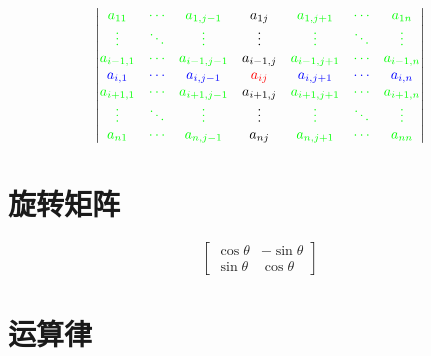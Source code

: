 \documentclass{article}
\begin{document}
\[\begin{vmatrix}
        \textcolor{green}{a_{11}}    & \textcolor{green}{\cdots} & \textcolor{green}{a_{1,j-1}}   & a_{1j}            & \textcolor{green}{a_{1,j+1}}   & \textcolor{green}{\cdots} & \textcolor{green}{a_{1n}}    \\
        \textcolor{green}{\vdots}    & \textcolor{green}{\ddots} & \textcolor{green}{\vdots}      & \vdots            & \textcolor{green}{\vdots}      & \textcolor{green}{\ddots} & \textcolor{green}{\vdots}    \\
        \textcolor{green}{a_{i-1,1}} & \textcolor{green}{\cdots} & \textcolor{green}{a_{i-1,j-1}} & a_{i-1,j}         & \textcolor{green}{a_{i-1,j+1}} & \textcolor{green}{\cdots} & \textcolor{green}{a_{i-1,n}} \\
        \textcolor{blue}{a_{i,1}}    & \textcolor{blue}{\cdots}  & \textcolor{blue}{a_{i,j-1}}    & \color{red}a_{ij} & \textcolor{blue}{a_{i,j+1}}    & \textcolor{blue}{\cdots}  & \textcolor{blue}{a_{i,n}}    \\
        \textcolor{green}{a_{i+1,1}} & \textcolor{green}{\cdots} & \textcolor{green}{a_{i+1,j-1}} & a_{i+1,j}         & \textcolor{green}{a_{i+1,j+1}} & \textcolor{green}{\cdots} & \textcolor{green}{a_{i+1,n}} \\
        \textcolor{green}{\vdots}    & \textcolor{green}{\ddots} & \textcolor{green}{\vdots}      & \vdots            & \textcolor{green}{\vdots}      & \textcolor{green}{\ddots} & \textcolor{green}{\vdots}    \\
        \textcolor{green}{a_{n1}}    & \textcolor{green}{\cdots} & \textcolor{green}{a_{n,j-1}}   & a_{nj}            & \textcolor{green}{a_{n,j+1}}   & \textcolor{green}{\cdots} & \textcolor{green}{a_{nn}}    \\
    \end{vmatrix}\]

\section{旋转矩阵}

\[\begin{bmatrix}
        \cos\theta & -\sin\theta \\
        \sin\theta & \cos\theta
    \end{bmatrix}\]

\section{运算律}
\end{document}
